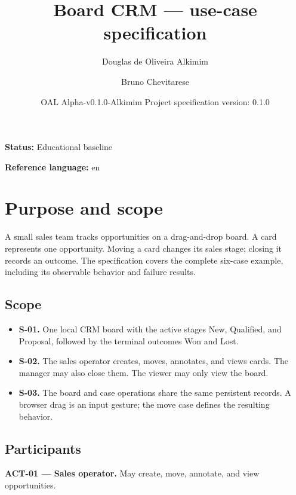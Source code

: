 \documentclass[10pt,a4paper]{article}
\begin{document}
\title{Board CRM --- use-case specification}

\author{Douglas de Oliveira Alkimim \and Bruno Chevitarese}

\date{OAL Alpha-v0.1.0-Alkimim \quad Project specification version: 0.1.0}

\maketitle

\textbf{Status:} Educational baseline

\textbf{Reference language:} en

\section{Purpose and scope}

A small sales team tracks opportunities on a drag-and-drop board. A card represents one opportunity. Moving a card changes its sales stage; closing it records an outcome. The specification covers the complete six-case example, including its observable behavior and failure results.

\subsection{Scope}

\begin{itemize}

\item \textbf{S-01.} One local CRM board with the active stages New, Qualified, and Proposal, followed by the terminal outcomes Won and Lost.

\item \textbf{S-02.} The sales operator creates, moves, annotates, and views cards. The manager may also close them. The viewer may only view the board.

\item \textbf{S-03.} The board and case operations share the same persistent records. A browser drag is an input gesture; the move case defines the resulting behavior.

\end{itemize}

\subsection{Participants}

\textbf{ACT-01 --- Sales operator.} May create, move, annotate, and view opportunities.
\end{document}
